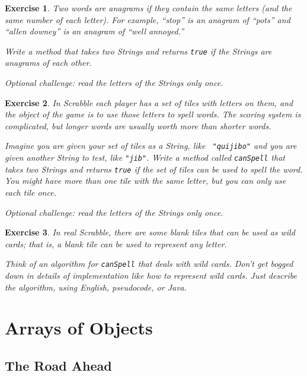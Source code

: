 \documentclass[12pt]{book}
\theoremstyle{exercise}
\newtheorem{exercise}{Exercise}[chapter]
\begin{document}
\begin{exercise}
Two words are anagrams if they contain the same letters (and the
same number of each letter).  For example, ``stop'' is an anagram
of ``pots'' and ``allen downey'' is an anagram of ``well annoyed.''

Write a method that takes two Strings and returns {\tt true} if
the Strings are anagrams of each other.

Optional challenge: read the letters of the Strings only once.
\end{exercise}


\begin{exercise}
In Scrabble each player has a set of tiles with letters on them, and
the object of the game is to use those letters to spell words.  The
scoring system is complicated, but longer words are usually
worth more than shorter words.

Imagine you are given your set of tiles as a String, like {\tt
"quijibo"} and you are given another String to test, like {\tt "jib"}.
Write a method called {\tt canSpell} that takes two Strings and
returns {\tt true} if the set of tiles can be used to spell the word.  You
might have more than one tile with the same letter, but you can only
use each tile once.

Optional challenge: read the letters of the Strings only once.
\end{exercise}


\begin{exercise}
In real Scrabble, there are some blank tiles that can be used
as wild cards; that is, a blank tile can be used to represent
any letter.

Think of an algorithm for {\tt canSpell} that deals with wild
cards.  Don't get bogged down in details of implementation like
how to represent wild cards.  Just describe the algorithm, using
English, pseudocode, or Java.
\end{exercise}



\chapter{Arrays of Objects}
\label{chap11}


\section{The Road Ahead}
\end{document}
